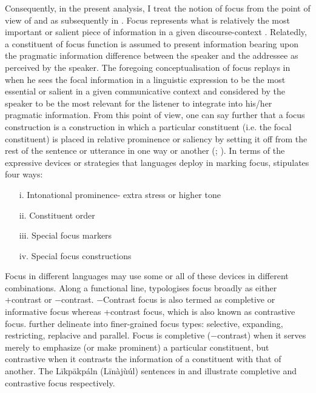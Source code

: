 \documentclass[output=paper,colorlinks,citecolor=brown]{langscibook}
\begin{document}
Consequently, in the present analysis, I treat the notion of focus from the point of view of \citet{Dik1981} and as subsequently in \citet{Dik1997}. Focus represents what is relatively the most important or salient piece of information in a given discourse-context \citep[42]{Dik1981}. Relatedly, a constituent of focus function is assumed to present information bearing upon the pragmatic information difference between the speaker and the addressee as perceived by the speaker. The foregoing conceptualisation of focus replays in \citet[326]{Dik1997} when he sees the focal information in a linguistic expression to be the most essential or salient in a given communicative context and considered by the speaker to be the most relevant for the listener to integrate into his/her pragmatic information. From this point of view, one can say further that a focus construction is a construction in which a particular constituent (i.e. the focal constituent) is placed in relative prominence or saliency by setting it off from the rest of the sentence or utterance in one way or another (\citealt{Boadi1974, DrubigSchaffer2001}; \citealt[185]{MarfoBodomo2005}). In terms of the expressive devices or strategies that languages deploy in marking focus, \citet[43]{Dik1981} stipulates four ways:

\begin{itemize}
    \item[i.] Intonational prominence- extra stress or higher tone
    \item[ii.] Constituent order
    \item [iii.] Special focus markers
    \item [iv.] Special focus constructions
\end{itemize}

Focus in different languages may use some or all of these devices in different combinations. Along a functional line, \citet[60]{Dik1981} typologises focus broadly as either +contrast or −contrast. −Contrast focus is also termed as completive or informative focus whereas +contrast focus, which is also known as contrastive focus. \citet{Akrofi-Ansah2014, Schwarz2009, SkopeteasEtAl2006} further delineate into finer-grained focus types: selective, expanding, restricting, replacive and parallel. Focus is completive (−contrast) when it serves merely to emphasize (or make prominent) a particular constituent, but contrastive when it contrasts the information of a constituent with that of another. The Līkpākpáln (Līnàjùúl) sentences in  and  illustrate completive and contrastive focus respectively.
\end{document}

